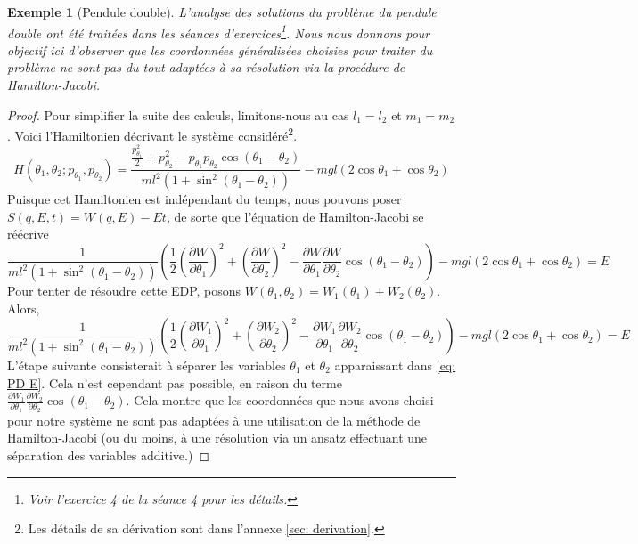 \documentclass[11pt,oneside,a4paper]{article}
\newcommand{\dif}[2]{\frac{\partial #1}{\partial #2}}
\newtheorem{example}[theorem]{Exemple}
\begin{document}
    \begin{example}[Pendule double]\label{ex: PD}
      L'analyse des solutions du problème du pendule double ont été traitées dans les séances d'exercices\footnote{Voir l'exercice 4 de la séance 4 pour les détails.}. Nous nous donnons pour objectif ici d'observer que les coordonnées généralisées choisies pour traiter du problème ne sont pas du tout adaptées à sa résolution via la procédure de Hamilton-Jacobi.
    \end{example}
    \begin{proof}  
      Pour simplifier la suite des calculs, limitons-nous au cas $l_1=l_2$ et $m_1=m_2$. Voici l'Hamiltonien décrivant le système considéré\footnote{Les détails de sa dérivation sont dans l'annexe \ref{sec: derivation}.}.
      \begin{equation}
        H(\theta_1,\theta_2;p_{\theta_1},p_{\theta_2}) = \frac{\frac{p_{\theta_1}^2}{2}+p_{\theta_2}^2-p_{\theta_1}p_{\theta_2}\cos\left(\theta_1-\theta_2\right)}{ml^2\left(1+\sin^2\left(\theta_1-\theta_2\right)\right)}-mgl\left(2\cos\theta_1+\cos\theta_2\right)
      \end{equation}
      Puisque cet Hamiltonien est indépendant du temps, nous pouvons poser $S(q,E,t) = W(q,E) - Et$, de sorte que l'équation de Hamilton-Jacobi se réécrive
      \begin{equation}
        \frac{1}{{ml^2\left(1+\sin^2\left(\theta_1-\theta_2\right)\right)}}\left(\frac{1}{2}\left(\dif{W}{\theta_1}\right)^2+\left(\dif{W}{\theta_2}\right)^2-\dif{W}{\theta_1}\dif{W}{\theta_2}\cos\left(\theta_1-\theta_2\right)\right)-mgl\left(2\cos\theta_1+\cos\theta_2\right) = E
      \end{equation}
      Pour tenter de résoudre cette EDP, posons $W(\theta_1,\theta_2) = W_1(\theta_1)+W_2(\theta_2)$. Alors,
      \begin{equation}
        \frac{1}{{ml^2\left(1+\sin^2\left(\theta_1-\theta_2\right)\right)}}\left(\frac{1}{2}\left(\dif{W_1}{\theta_1}\right)^2+\left(\dif{W_2}{\theta_2}\right)^2-\dif{W_1}{\theta_1}\dif{W_2}{\theta_2}\cos\left(\theta_1-\theta_2\right)\right)-mgl\left(2\cos\theta_1+\cos\theta_2\right) = E\label{eq: PD E}
      \end{equation}
      L'étape suivante consisterait à séparer les variables $\theta_1$ et $\theta_2$ apparaissant dans \eqref{eq: PD E}. Cela n'est cependant pas possible, en raison du terme $\dif{W_1}{\theta_1}\dif{W_2}{\theta_2}\cos\left(\theta_1-\theta_2\right)$. Cela montre que les coordonnées que nous avons choisi pour notre système ne sont pas adaptées à une utilisation de la méthode de Hamilton-Jacobi (ou du moins, à une résolution via un ansatz effectuant une séparation des variables additive.)
    \end{proof}
\end{document}
